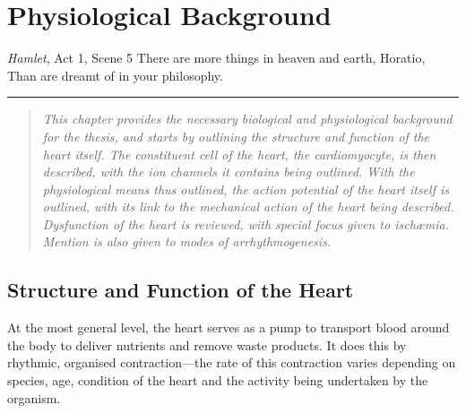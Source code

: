 \documentclass[../thesis-main.tex]{subfiles}
\begin{document}
\titleformat{\subsubsection}{\normalfont\itshape\large}{\thesection}{.5em}{}

\chapter{Physiological Background}
\label{ch:physio-background}

\begin{aquote}{\emph{Hamlet}, Act 1, Scene 5}
{\selectfont
 There are more things in heaven and earth, Horatio,\\
 Than are dreamt of in your philosophy.
}
\end{aquote}
\rule{\linewidth}{0.25mm}

\begin{quote}
 \emph{This chapter provides the necessary biological and physiological background for the thesis, and starts by outlining the structure and function of the heart itself. The constituent cell of the heart, the cardiomyocyte, is then described, with the ion channels it contains being outlined. With the physiological means thus outlined, the action potential of the heart itself is outlined, with its link to the mechanical action of the heart being described. Dysfunction of the heart is reviewed, with special focus given to isch\ae{}mia. Mention is also given to modes of arrhythmogenesis.}
\end{quote}

\section{Structure and Function of the Heart}
At the most general level, the heart serves as a pump to transport blood around the body to deliver nutrients and remove waste products. It does this by rhythmic, organised contraction---the rate of this contraction varies depending on species, age, condition of the heart and the activity being undertaken by the organism.
\end{document}
